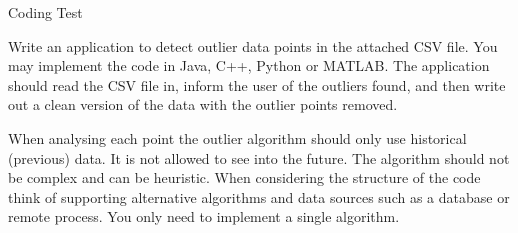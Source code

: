 Coding Test


Write an application to detect outlier data points in the attached CSV file.
You may implement the code in Java, C++, Python or MATLAB.
The application should read the CSV file in, inform the user of the outliers found, and then write out a clean version of the data with the outlier points removed.
 
When analysing each point the outlier algorithm should only use historical (previous) data. 
It is not allowed to see into the future. The algorithm should not be complex and can be heuristic.
When considering the structure of the code think of supporting alternative algorithms and data sources such as a database or remote process.
You only need to implement a single algorithm.
